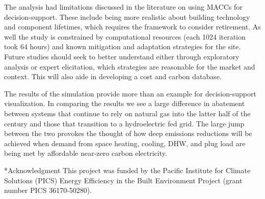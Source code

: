 \documentclass[twocolumn, a4paper,10pt]{article}
\makeatletter
\renewcommand\section{\@startsection{section}{1}{\z@}{3pt}{3pt}{\normalfont\large\bfseries}}
\makeatother
\begin{document}
The analysis had limitations discussed in the literature on using MACCs for decision-support. These include being more realistic about building technology and component lifetimes, which requires the framework to consider retirement. As well the study is constrained by computational resources (each 1024 iteration took 64 hours) and known mitigation and adaptation strategies for the site. Future studies should seek to better understand either through exploratory analysis or expert elicitation, which strategies are reasonable for the market and context. This will also aide in developing a cost and carbon database.

The results of the simulation provide more than an example for decision-support visualization. In comparing the results we see a large difference in abatement between systems that continue to rely on natural gas into the latter half of the century and those that transition to a hydroelectric fed grid. The large jump between the two provokes the thought of how deep emissions reductions will be achieved when demand from space heating, cooling, DHW, and plug load are being met by affordable near-zero carbon electricity.

\section*{Acknowledgment}
This project was funded by the Pacific Institute for Climate Solutions (PICS) Energy Efficiency in the Built Environment Project (grant number PICS 36170-50280).

\footnotesize


\end{document}

